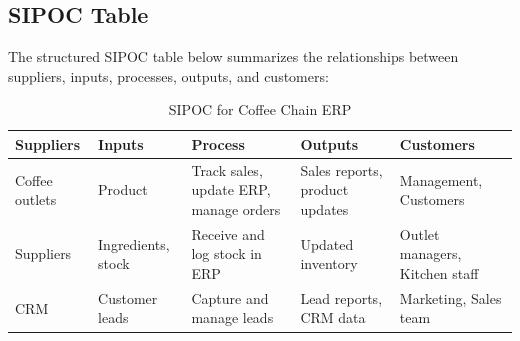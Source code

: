 \subsection*{SIPOC Table}
The structured SIPOC table below summarizes the relationships between suppliers, inputs, processes, outputs, and customers:
\begin{table}[H]
\centering
\begin{tabular}{|p{3cm}|p{3cm}|p{4cm}|p{3cm}|p{3cm}|}
\hline
\textbf{Suppliers} & \textbf{Inputs} & \textbf{Process} & \textbf{Outputs} & \textbf{Customers} \\
\hline
Coffee outlets & Product & Track sales, update ERP, manage orders & Sales reports, product updates & Management, Customers \\
\hline
Suppliers & Ingredients, stock & Receive and log stock in ERP & Updated inventory & Outlet managers, Kitchen staff \\
\hline
CRM & Customer leads & Capture and manage leads & Lead reports, CRM data & Marketing, Sales team \\
\hline
\end{tabular}
\caption{SIPOC for Coffee Chain ERP}
\label{tab:sipoc_summary}
\end{table}

